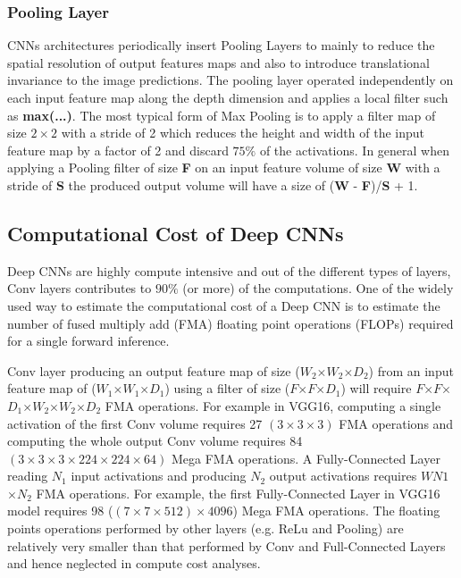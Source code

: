 \documentclass[10, sigconf]{acmart}
\begin{document}
\subsubsection{Pooling Layer}
CNNs architectures periodically insert Pooling Layers to mainly to reduce the spatial resolution of output features maps and also to introduce translational invariance to the image predictions. The pooling layer operated independently on each input feature map along the depth dimension and applies a local filter such as \textbf{max(...)}. The most typical form of Max Pooling is to apply a filter map of size $2\times2$ with a stride of 2 which reduces the height and width of the input feature map by a factor of 2 and discard $75\%$ of the activations. In general when applying a Pooling filter of size \textbf{F} on an input feature volume of size \textbf{W} with a stride of \textbf{S} the produced output volume will have a size of (\textbf{W} - \textbf{F})/\textbf{S} + 1.

\subsection{Computational Cost of Deep CNNs}
Deep CNNs are highly compute intensive and out of the different types of layers, Conv layers contributes to $90\%$ (or more) of the computations. One of the widely used way to estimate the computational cost of a Deep CNN is to estimate the number of fused multiply add (FMA) floating point operations (FLOPs) required for a single forward inference.

Conv layer producing an output feature map of size (\textbf{$W_2$}$\times$\textbf{$W_2$}$\times$\textbf{$D_2$}) from an input feature map of (\textbf{$W_1$}$\times$\textbf{$W_1$}$\times$\textbf{$D_1$}) using a filter of size (\textbf{$F$}$\times$\textbf{$F$}$\times$\textbf{$D_1$}) will require \textbf{$F$}$\times$\textbf{$F$}$\times$\textbf{$D_1$}$\times$\textbf{$W_2$}$\times$\textbf{$W_2$}$\times$\textbf{$D_2$} FMA operations.
For example in VGG16, computing a single activation of the first Conv volume requires 27 $(3\times3\times3)$ FMA operations and computing the whole output Conv volume requires 84 $(3\times3\times3\times224\times224\times64)$ Mega FMA operations. A Fully-Connected Layer reading \textbf{$N_1$} input activations and producing \textbf{$N_2$} output activations requires \textbf{$WN1$}$\times$\textbf{$N_2$} FMA operations.
For example, the first Fully-Connected Layer in VGG16 model requires 98 ($(7\times7\times512)\times4096$) Mega FMA operations.
The floating points operations performed by other layers (e.g. ReLu and Pooling) are relatively very smaller than that performed by Conv and Full-Connected Layers and hence neglected in compute cost analyses.
\end{document}
